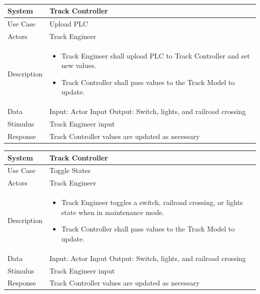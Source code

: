 \documentclass{article}
\begin{document}
    \paragraph{}
   \begin{longtable}{
    || >{\raggedright\arraybackslash}m{}
    | >{\raggedright\arraybackslash}m{}||}
    \hline
    \textbf{System} & \textbf{Track Controller} \\
    \hline
    Use Case & Upload PLC\\
    \hline
    Actors & Track Engineer\\
    \hline
    Description & \begin{itemize}
        \item Track Engineer shall upload PLC to Track Controller and set new values. 
        \item Track Controller shall pass values to the Track Model to update. 
    \end{itemize}\\
    \hline
    Data & Input: Actor Input \newline Output: Switch, lights, and railroad crossing\\
    \hline
    Stimulus & Track Engineer input\\
    \hline
    Response & Track Controller values are updated as necessary\\
    \hline
    \end{longtable}
    \begin{longtable}{
    || >{\raggedright\arraybackslash}m{}
    | >{\raggedright\arraybackslash}m{}||}
    \hline
    \textbf{System} & \textbf{Track Controller} \\
    \hline
    Use Case & Toggle States\\
    \hline
    Actors & Track Engineer\\
    \hline
    Description & \begin{itemize}
        \item Track Engineer toggles a switch, railroad crossing, or lights state when in maintenance mode.
        \item Track Controller shall pass values to the Track Model to update. 
    \end{itemize}\\
    \hline
    Data & Input: Actor Input \newline Output: Switch, lights, and railroad crossing\\
    \hline
    Stimulus & Track Engineer input\\
    \hline
    Response & Track Controller values are updated as necessary\\
    \hline
    \end{longtable}
\end{document}
